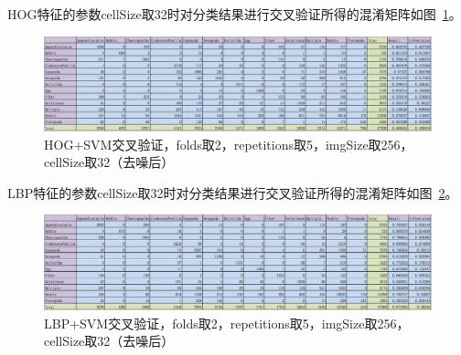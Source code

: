 \documentclass[12pt]{article}
\begin{document}
HOG特征的参数cellSize取32时对分类结果进行交叉验证所得的混淆矩阵如图~\ref{fig:HOG-SVM-2-folds-5-repetitions-32-256-2}。
\begin{figure}[!ht]
\centering
\includegraphics[width=1.0\linewidth]{HOG-SVM-2-folds-5-repetitions-32-256-2}
\caption{HOG+SVM交叉验证，folds取2，repetitions取5，imgSize取256，cellSize取32（去噪后）}
\label{fig:HOG-SVM-2-folds-5-repetitions-32-256-2}
\end{figure}

LBP特征的参数cellSize取32时对分类结果进行交叉验证所得的混淆矩阵如图~\ref{fig:LBP-SVM-2-folds-5-repetitions-32-256-2}。
\begin{figure}[!ht]
\centering
\includegraphics[width=1.0\linewidth]{LBP-SVM-2-folds-5-repetitions-32-256-2}
\caption{LBP+SVM交叉验证，folds取2，repetitions取5，imgSize取256，cellSize取32（去噪后）}
\label{fig:LBP-SVM-2-folds-5-repetitions-32-256-2}
\end{figure}
\end{document}
